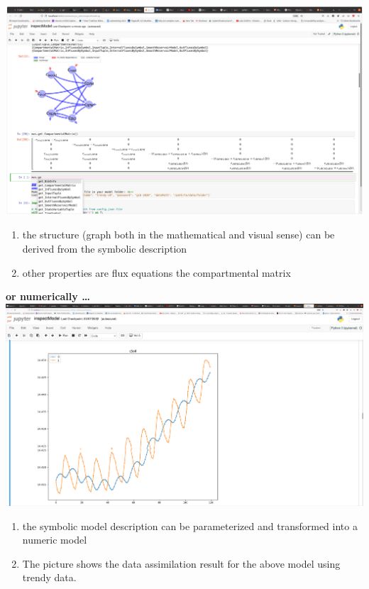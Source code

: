 \documentclass[36pt]{article}
\begin{document}
\begin{tcbposter}
{	\includegraphics[width=\columnwidth]{mvsTabScreen.png}
	\begin{enumerate}
	\item 
	the structure (graph both in the mathematical and visual sense) can be derived from the symbolic description
	\item other properties are flux equations the compartmental matrix
	\end{enumerate}
	{\bfseries\large or numerically \dots}\\
	\includegraphics[width=.5\columnwidth]{DataAssimilation.png}
	\begin{enumerate}
	\item 
	the symbolic model description can be parameterized and transformed into a numeric model
	\item The picture shows the data assimilation result for the above model using trendy data.
	\end{enumerate}
}



\end{tcbposter}
\end{document}
